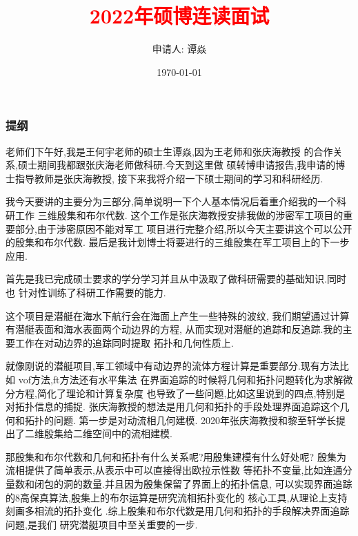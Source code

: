 \documentclass[UTF8]{ctexbeamer}	%
\title{\textcolor{red}{2022年硕博连读面试}}
\author{申请人: 谭焱 
 }
\institute{\small{现硕士导师: 王何宇 、张庆海 \newline 拟转博士指导教师: 张庆海} \newline   \newline 浙江大学数学科学学院}
\date{\today}
\theoremstyle{plain}
\theoremstyle{definition}
\theoremstyle{remark}
\numberwithin{equation}{section}
\begin{document}
\begin{frame}
  \titlepage
\end{frame}


\begin{frame}
  \frametitle{提纲}
  \tableofcontents
\end{frame}

\begin{frame}
  老师们下午好,我是王何宇老师的硕士生谭焱,因为王老师和张庆海教授
  的合作关系,硕士期间我都跟张庆海老师做科研.今天到这里做
  硕转博申请报告,我申请的博士指导教师是张庆海教授,
  接下来我将介绍一下硕士期间的学习和科研经历.
\end{frame}

\begin{frame}
  我今天要讲的主要分为三部分,简单说明一下个人基本情况后着重介绍我的一个科研工作
  三维殷集和布尔代数.
  这个工作是张庆海教授安排我做的涉密军工项目的重要部分,由于涉密原因不能对军工
  项目进行完整介绍,所以今天主要讲这个可以公开的殷集和布尔代数.
  最后是我计划博士将要进行的三维殷集在军工项目上的下一步应用.
\end{frame}

\begin{frame}
  首先是我已完成硕士要求的学分学习并且从中汲取了做科研需要的基础知识.同时也
  针对性训练了科研工作需要的能力.
\end{frame}

\begin{frame}
  这个项目是潜艇在海水下航行会在海面上产生一些特殊的波纹,
  我们期望通过计算有潜艇表面和海水表面两个动边界的方程,
  从而实现对潜艇的追踪和反追踪.我的主要工作在对动边界的追踪同时提取
  拓扑和几何性质上.
\end{frame}

\begin{frame}
  就像刚说的潜艇项目,军工领域中有动边界的流体方程计算是重要部分.现有方法比如
  vof方法,ft方法还有水平集法
  在界面追踪的时候将几何和拓扑问题转化为求解微分方程,简化了理论和计算复杂度
  也导致了一些问题,比如这里说到的四点,特别是对拓扑信息的捕捉.
  张庆海教授的想法是用几何和拓扑的手段处理界面追踪这个几何和拓扑的问题.
  第一步是对动流相几何建模.
  2020年张庆海教授和黎至轩学长提出了二维殷集给二维空间中的流相建模.
\end{frame}

\begin{frame}
  那殷集和布尔代数和几何和拓扑有什么关系呢?用殷集建模有什么好处呢?
  殷集为流相提供了简单表示,从表示中可以直接得出欧拉示性数
  等拓扑不变量,比如连通分量数和闭包的洞的数量.并且因为殷集保留了界面上的拓扑信息,
  可以实现界面追踪的8高保真算法,殷集上的布尔运算是研究流相拓扑变化的
  核心工具,从理论上支持刻画多相流的拓扑变化
  .综上殷集和布尔代数是用几何和拓扑的手段解决界面追踪问题,是我们
  研究潜艇项目中至关重要的一步.
\end{frame}
\end{document}
